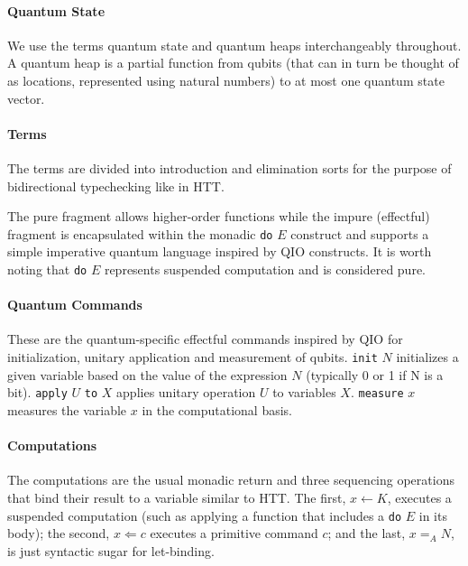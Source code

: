 \documentclass[acmsmall,nonacm,timestamp,review=false,anonymous=false]{acmart}
\newcommand{\kw}[1]{\,\mathrm{\texttt{#1}}\,}
\begin{document}
\paragraph{Quantum State}

We use the terms quantum state and quantum heaps interchangeably throughout. A quantum heap is a partial function from qubits (that can in turn be thought of as locations, represented using natural numbers) to at most one quantum state vector.


\paragraph{Terms}
The terms are divided into introduction and elimination sorts for the purpose of bidirectional typechecking like in HTT.

The pure fragment allows higher-order functions while the impure (effectful) fragment is encapsulated within the monadic \texttt{do} $E$ construct and supports a simple imperative quantum language inspired by QIO constructs. It is worth noting that \texttt{do} $E$ represents suspended computation and is considered pure.

\paragraph{Quantum Commands}
These are the quantum-specific effectful commands inspired by QIO for initialization, unitary application and measurement of qubits.
\texttt{init} $N$ initializes a given variable based on the value of the expression $N$ (typically 0 or 1 if N is a bit).
\texttt{apply} $U$ \texttt{to} $X$ applies unitary operation $U$ to variables $X$.
\texttt{measure} $x$ measures the variable $x$ in the computational basis.

\paragraph{Computations} The computations are the usual monadic return and three sequencing operations that bind their result to a variable similar to HTT. The first, $x \leftarrow K$, executes a suspended computation (such as applying a function that includes a \texttt{do} $E$ in its body); the second, $x \Leftarrow c$ executes a primitive command $c$; and the last, $x =_A N$, is just syntactic sugar for let-binding.
\end{document}
